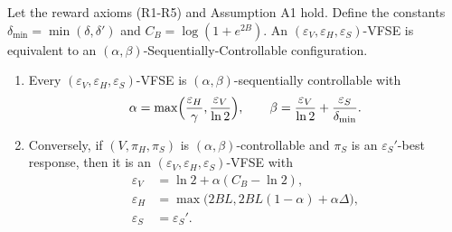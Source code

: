 \begin{theorem}[Equivalence]
\label{thm:equivalence}
Let the reward axioms (R1-R5) and Assumption A1 hold. Define the constants $\delta_{\min} = \min(\delta, \delta')$ and $C_B = \log(1+e^{2B})$. An $(\varepsilon_V, \varepsilon_H, \varepsilon_S)$-VFSE is equivalent to an $(\alpha, \beta)$-Sequentially-Controllable configuration.
\begin{enumerate}
\item[(i)] Every $(\varepsilon_V,\varepsilon_H,\varepsilon_S)$-VFSE is $(\alpha,\beta)$-sequentially controllable with
           \[
             \alpha=\max\Bigl(\frac{\varepsilon_H}{\gamma}, \frac{\varepsilon_V}{\ln 2}\Bigr),
             \qquad
             \beta=\frac{\varepsilon_V}{\ln 2}+\frac{\varepsilon_S}{\delta_{\min}}.
           \]
\item[(ii)] Conversely, if $(V,\pi_H,\pi_S)$ is $(\alpha,\beta)$-controllable and $\pi_S$ is an $\varepsilon_S'$-best response, then it is an $(\varepsilon_V,\varepsilon_H,\varepsilon_S)$-VFSE with
           \begin{align*}
             \varepsilon_V &= \ln 2+\alpha(C_B-\ln 2), \\
             \varepsilon_H &= \max\bigl(2BL, 2BL(1-\alpha) + \alpha\Delta\bigr), \\
             \varepsilon_S &= \varepsilon_S'.
           \end{align*}
\end{enumerate}
\end{theorem}

